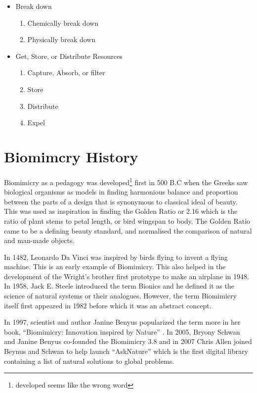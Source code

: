 \begin{itemize}
\item Break down
  \begin{enumerate}
    \item Chemically break down
    \item Physically break down
  \end{enumerate}

\item Get, Store, or Distribute Resources
  \begin{enumerate}
    \item Capture, Absorb, or filter
    \item Store
    \item Distribute
    \item Expel
  \end{enumerate}
  
\end{itemize}

\section{Biomimcry History}

Biomimicry as a pedagogy was developed\footnote{developed seems like the wrong word} first in 500 B.C when the Greeks saw biological organisms as models in finding harmonious balance and proportion between the parts of a design that is synonymous to classical ideal of beauty. This was used as inspiration in finding the Golden Ratio or 2.16 which is the ratio of plant stems to petal length, or bird wingspan to body. The Golden Ratio came to be a defining beauty standard, and normalised the comparison of natural and man-made objects. 

In 1482, Leonardo Da Vinci was inspired by birds flying to invent a flying machine. This is an early example of Biomimicry. This also helped in the development of the Wright's brother first prototype to make an airplane in 1948. In 1958, Jack E. Steele introduced the term Bionics and he defined it as the science of natural systems or their analogues.  However, the term Biomimicry itself first appeared in 1982 before which it was an abstract concept. 

In 1997, scientist and author Janine Benyus popularized the term more in her book, ``Biomimicry: Innovation inspired by Nature'' . In 2005, Bryony Schwan and Janine Benyus co-founded the Biomimicry 3.8 and in 2007 Chris Allen joined Beynus and Schwan to help launch ``AskNature'' which is the first digital library containing a list of natural solutions to global problems. 

